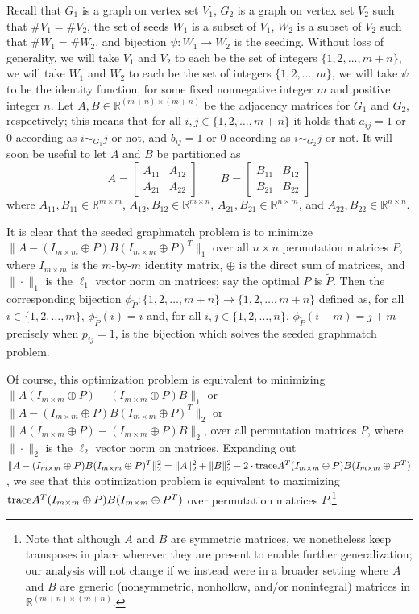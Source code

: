 \documentclass[12pt]{article}
\newcommand{\R}{\mathbb{R}}
\newcommand{\tr}{\textup{trace}}
\begin{document}
Recall that $G_1$ is a graph on vertex set $V_1$, $G_2$ is a
graph on vertex set $V_2$ such that $\#V_1=\#V_2$, the set of seeds
$W_1$ is a subset of $V_1$, $W_2$ is a subset of $V_2$ such that
$\#W_1=\#W_2$, and bijection $\psi:W_1 \rightarrow W_2$
is the seeding. Without loss of generality, we will take
$V_1$ and $V_2$ to each be the set of integers $\{1,2,\ldots,m+n\}$,
we will take $W_1$ and $W_2$ to each be the set of integers
$\{ 1,2,\ldots,m \}$, we will take $\psi$ to be the identity
function, for some fixed nonnegative integer $m$ and positive integer $n$.
Let $A,B \in \R^{(m+n)\times (m+n)}$ be the adjacency matrices
for $G_1$ and $G_2$, respectively; this means that
for all $i,j \in \{1,2,\ldots,m+n\}$
it holds that $a_{ij}=1$ or $0$ according as $i \sim_{G_1} j$ or not,
and  $b_{ij}=1$ or $0$ according as $i \sim_{G_2} j$ or not.
It will soon be useful to let $A$ and $B$ be partitioned as
\[  A =\left [
\begin{array}{cc} A_{11} & A_{12} \\ A_{21} & A_{22} \end{array} \right ]
\ \ \ \ \ \ \ \ \ B =\left [
\begin{array}{cc} B_{11} & B_{12} \\ B_{21} & B_{22} \end{array} \right ]
\]
where $A_{11},B_{11}\in \R^{m \times m}$,
$A_{12},B_{12}\in \R^{m \times n}$, $A_{21},B_{21}\in \R^{n \times m}$, and
$A_{22},B_{22}\in \R^{n \times n}$.


It is clear that  the seeded graphmatch problem is to
minimize $\|A-(I_{m \times m}\oplus P)B(I_{m \times m}\oplus P)^T\|_1$ over all $n \times n$ permutation matrices $P$, where $I_{m \times m}$ is the $m$-by-$m$
identity matrix, $\oplus$ is the direct sum of matrices,
and $\| \cdot \|_1$ is the $\ell_1$  vector norm on matrices;
say the optimal $P$ is $\tilde{P}$.
Then the corresponding bijection $\phi_{\tilde{P}}: \{1,2,\ldots,m+n\} \rightarrow \{1,2,\ldots,m+n\}$
defined as, for all $i \in \{1,2,\ldots,m\}$, $\phi_{\tilde{P}}(i)=i$ and,
for all $i,j \in \{1,2,\ldots,n\}$, $\phi_{\tilde{P}} (i+m)=j+m$ precisely when $\tilde{p}_{ij}=1$, is the bijection which solves the seeded graphmatch problem.

Of course, this optimization problem is equivalent to minimizing
$\|A(I_{m \times m}\oplus P)-(I_{m \times m}\oplus P)B\|_1$ or
$\|A-(I_{m \times m}\oplus P)B(I_{m \times m}\oplus P)^T\|_2$ or
$\|A(I_{m \times m}\oplus P)-(I_{m \times m}\oplus P)B\|_2$, over all
permutation matrices $P$,
where $\| \cdot \|_2$ is the $\ell_2$ vector norm on matrices.
Expanding out $\|A-(I_{m \times m}\oplus P)B(I_{m \times m}\oplus P)^T\|_2^2=
\|A\|_2^2 + \|B\|_2^2
- 2 \cdot \tr A^T(I_{m \times m}\oplus P)B(I_{m \times m}\oplus P^T)$,
we see that this optimization problem is equivalent to maximizing $\tr A^T(I_{m \times m}\oplus P)B(I_{m \times m}\oplus P^T)$
over permutation matrices $P$.\footnote{Note that although $A$ and $B$ are
symmetric matrices, we nonetheless keep transposes in place wherever
they are present to enable further generalization;
our analysis will not change if we instead were
in a broader setting where $A$ and $B$ are
generic (nonsymmetric, nonhollow, and/or nonintegral) matrices in
$\R^{(m+n)\times (m+n)}$.}
\end{document}
